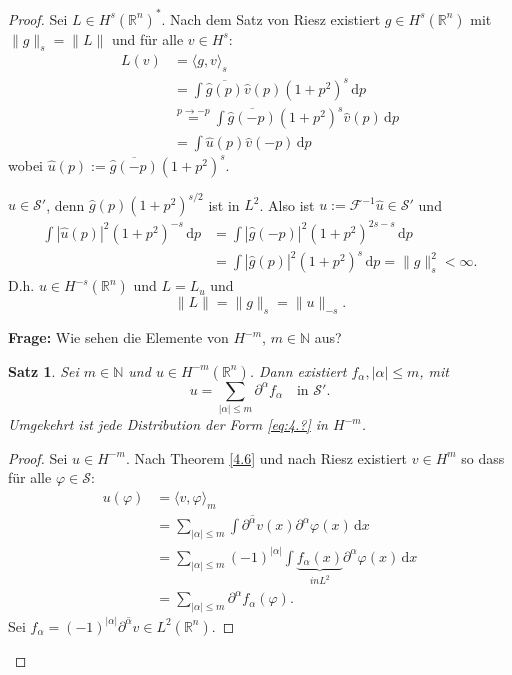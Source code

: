 \documentclass[
paper=a4,
bibtotocnumbered,
liststotocnumbered,
tablecaptionabove,
pointlessnumbers,
twoside,
openright,
10pt
]
{report}
\let\phi\varphi
\newtheorem{satz}[thm]{Satz}
\theoremstyle{definition}
\numberwithin{equation}{chapter}
\begin{document}
\begin{proof}
Sei $L\in H^s(\mathbb R^n)^*$. Nach dem Satz von Riesz existiert $g\in H^s(\mathbb R^n)$ mit $\|g\|_s = \|L\|$ und für alle $v\in H^s$:
\begin{align*}
L(v) &= \langle g,v\rangle_s \\
&= \int \overline{\hat g(p)} \hat v(p) (1+p^2)^s \, \mathrm dp\\
&\stackrel{p\to -p}= \int \overline{\hat g(-p)} (1+p^2)^s \hat v(p) \, \mathrm dp\\
&= \int \hat u(p) \hat v(-p) \, \mathrm dp
\end{align*}
wobei $\hat u(p):= \overline{\hat g(-p)} (1+p^2)^s$.

$\hat u\in \mathcal S'$, denn $\hat g(p) (1+p^2)^{s/2}$ ist in $L^2$. Also ist $u:= \mathcal F^{-1}\hat u \in \mathcal S'$ und
\begin{align}
\int|\hat u (p)|^2 (1+p^2)^{-s}\, \mathrm dp&=\int |\hat g(-p)|^2 (1+p^2)^{2s-s}\, \mathrm dp\\
&= \int |\hat g(p)|^2(1+p^2)^s\, \mathrm dp = \| g\|_s^2 <\infty.
\end{align}
D.h. $u\in H^{-s}(\mathbb R^n)$ und $L= L_u$ und
\begin{equation}
\|L\| = \|g\|_s = \|u\|_{-s}.
\end{equation}

\textbf{Frage:} Wie sehen die Elemente von $H^{-m}$, $m\in \mathbb N$ aus?

\begin{satz}\label{4.7}
Sei $m\in \mathbb N$ und $u\in H^{-m}(\mathbb R^n)$. Dann existiert $f_\alpha, |\alpha|\le m$, mit
\begin{equation}\label{eq:4.?}
u = \sum_{|\alpha|\le m} \partial^\alpha f_\alpha \quad \text{in } \mathcal S'.
\end{equation}
Umgekehrt ist jede Distribution der Form \eqref{eq:4.?} in $H^{-m}$.
\end{satz}
\begin{proof}
Sei $u\in H^{-m}$. Nach Theorem \ref{4.6} und nach Riesz existiert $v\in H^m$ so dass für alle $\phi \in \mathcal S$:
\begin{align}
u(\phi) &= \langle v, \phi\rangle_m\\
&= \sum_{|\alpha|\le m} \int \overline{\partial^\alpha v}(x) \partial^\alpha \phi(x)\, \mathrm dx\\
&= \sum_{|\alpha|\le m} (-1)^{|\alpha|} \int \underbrace{f_\alpha(x)}_{in L^2} \partial^\alpha \phi(x) \, \mathrm dx\\
&= \sum_{|\alpha|\le m} \partial^\alpha f_\alpha (\phi).
\end{align}
Sei $f_\alpha= (-1)^{|\alpha|} \overline{\partial^\alpha v} \in L^2(\mathbb R^n)$.


\end{proof}
\end{proof}
\end{document}
